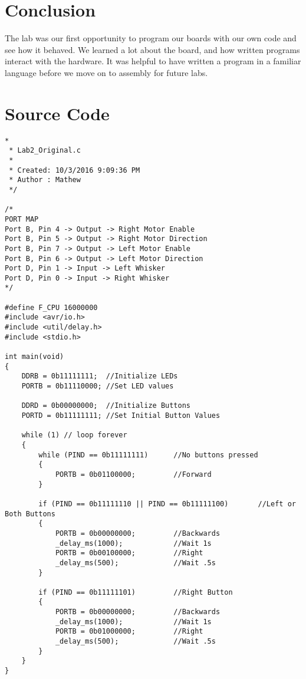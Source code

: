 \documentclass[12pt,letterpaper]{article}
\begin{document}
\section{Conclusion}
The lab was our first opportunity to program our boards with our own code and see how it behaved. We learned a lot about the board, and how written programs interact with the hardware. It was helpful to have written a program in a familiar language before we move on to assembly for future labs. 

\section{Source Code}
\begin{verbatim}
*
 * Lab2_Original.c
 *
 * Created: 10/3/2016 9:09:36 PM
 * Author : Mathew
 */ 

/*
PORT MAP
Port B, Pin 4 -> Output -> Right Motor Enable
Port B, Pin 5 -> Output -> Right Motor Direction
Port B, Pin 7 -> Output -> Left Motor Enable
Port B, Pin 6 -> Output -> Left Motor Direction
Port D, Pin 1 -> Input -> Left Whisker
Port D, Pin 0 -> Input -> Right Whisker
*/

#define F_CPU 16000000
#include <avr/io.h>
#include <util/delay.h>
#include <stdio.h>

int main(void)
{
	DDRB = 0b11111111;	//Initialize LEDs
	PORTB = 0b11110000; //Set LED values
	
	DDRD = 0b00000000;	//Initialize Buttons
	PORTD = 0b11111111;	//Set Initial Button Values

	while (1) // loop forever
	{
		while (PIND == 0b11111111)		//No buttons pressed
		{
			PORTB = 0b01100000;			//Forward
		}
		
		if (PIND == 0b11111110 || PIND == 0b11111100)		//Left or Both Buttons
		{
			PORTB = 0b00000000;			//Backwards
			_delay_ms(1000);			//Wait 1s
			PORTB = 0b00100000;			//Right
			_delay_ms(500);				//Wait .5s
		}

		if (PIND == 0b11111101)			//Right Button
		{
			PORTB = 0b00000000;			//Backwards
			_delay_ms(1000);			//Wait 1s
			PORTB = 0b01000000;			//Right
			_delay_ms(500);				//Wait .5s
		}
	}
}
\end{verbatim}
\end{document}
